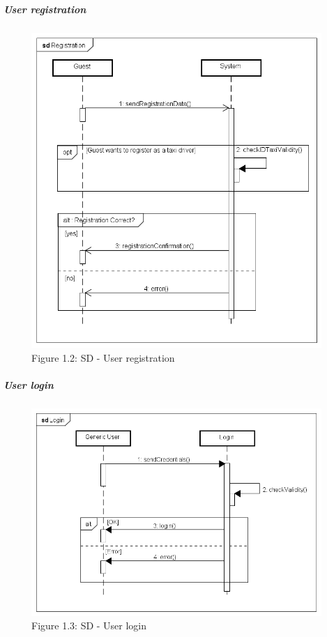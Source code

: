 \subparagraph{User registration}
\noindent
    \begin{figure}[h]
        \includegraphics[width=11cm]{./Diagrams/Registration.png}
        \newline Figure 1.2: SD - User registration
        \centering
    \end{figure}
\newpage
\subparagraph{User login}
\noindent
\begin{figure}[h]
        \includegraphics[width=11cm]{./Diagrams/Login.png}
        \newline Figure 1.3: SD - User login
        \centering
    \end{figure}
\noindent

